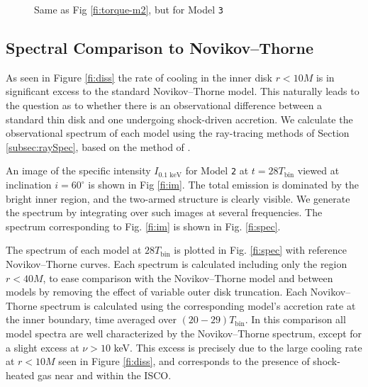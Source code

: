 \documentclass{emulateapj}
\newcommand{\model}[1]{{Model \texttt{#1}}}
\begin{document}
\begin{figure}
	\caption{\label{fi:torque-m4} Same as Fig \ref{fi:torque-m2}, but for \model{3}}  
\end{figure}

\subsection{Spectral Comparison to Novikov--Thorne}
\label{subsec:spectra}

As seen in Figure \ref{fi:diss} the rate of cooling in the inner disk $r < 10M$ is in significant excess to the standard Novikov--Thorne model.  This naturally leads to the question as to whether there is an observational difference between a standard thin disk and one undergoing shock-driven accretion.  We calculate the observational spectrum of each model using the ray-tracing methods of Section \ref{subsec:raySpec}, based on the method of \cite{Kulkarni11}.

\begin{figure*}
	\caption{\label{fi:im} Ray-traced image of \model{2} at $\nu =   1$ keV. Shocks are clearly visible even near the black hole's shadow.  Relativistic beaming increases the intensity of observed emission in material with velocities toward the observer.}
\end{figure*}

An image of the specific intensity $I_{0.1\text{ keV}}$ for \model{2} at $t=28 T_\text{bin}$ viewed at inclination $i=60^\circ$ is shown in Fig \ref{fi:im}.  The total emission is dominated by the bright inner region, and the two-armed structure is clearly visible. We generate the spectrum by integrating over such images at several frequencies.  The spectrum corresponding to Fig. \ref{fi:im} is shown in Fig. \ref{fi:spec}. 

The spectrum of each model at $28 T_\text{bin}$ is plotted in Fig. \ref{fi:spec} with reference Novikov--Thorne curves.  Each spectrum is calculated including only the region $r<40M$, to ease comparison with the Novikov--Thorne model and between models by removing the effect of variable outer disk truncation.  Each Novikov--Thorne spectrum is calculated using the corresponding model's accretion rate at the inner boundary, time averaged over $(20-29)T_\text{bin}$.  In this comparison all model spectra are well characterized by the Novikov--Thorne spectrum, except for a slight excess at $\nu > 10$ keV.  This excess is precisely due to the large cooling rate at $r<10M$ seen in Figure \ref{fi:diss}, and corresponds to the presence of shock-heated gas near and within the ISCO.  
\end{document}

